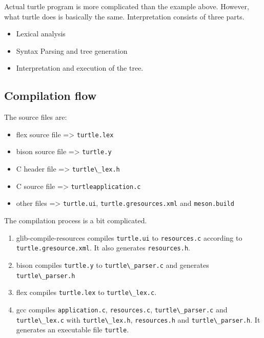 Actual turtle program is more complicated than the example above.
However, what turtle does is basically the same. Interpretation consists
of three parts.

\begin{itemize}
\tightlist
\item
  Lexical analysis
\item
  Syntax Parsing and tree generation
\item
  Interpretation and execution of the tree.
\end{itemize}

\subsection{Compilation flow}\label{compilation-flow}

The source files are:

\begin{itemize}
\tightlist
\item
  flex source file =\textgreater{} \passthrough{\lstinline!turtle.lex!}
\item
  bison source file =\textgreater{} \passthrough{\lstinline!turtle.y!}
\item
  C header file =\textgreater{} \passthrough{\lstinline!turtle\_lex.h!}
\item
  C source file =\textgreater{}
  \passthrough{\lstinline!turtleapplication.c!}
\item
  other files =\textgreater{} \passthrough{\lstinline!turtle.ui!},
  \passthrough{\lstinline!turtle.gresources.xml!} and
  \passthrough{\lstinline!meson.build!}
\end{itemize}

The compilation process is a bit complicated.

\begin{enumerate}
\def\labelenumi{\arabic{enumi}.}
\tightlist
\item
  glib-compile-resources compiles \passthrough{\lstinline!turtle.ui!} to
  \passthrough{\lstinline!resources.c!} according to
  \passthrough{\lstinline!turtle.gresource.xml!}. It also generates
  \passthrough{\lstinline!resources.h!}.
\item
  bison compiles \passthrough{\lstinline!turtle.y!} to
  \passthrough{\lstinline!turtle\_parser.c!} and generates
  \passthrough{\lstinline!turtle\_parser.h!}
\item
  flex compiles \passthrough{\lstinline!turtle.lex!} to
  \passthrough{\lstinline!turtle\_lex.c!}.
\item
  gcc compiles \passthrough{\lstinline!application.c!},
  \passthrough{\lstinline!resources.c!},
  \passthrough{\lstinline!turtle\_parser.c!} and
  \passthrough{\lstinline!turtle\_lex.c!} with
  \passthrough{\lstinline!turtle\_lex.h!},
  \passthrough{\lstinline!resources.h!} and
  \passthrough{\lstinline!turtle\_parser.h!}. It generates an executable
  file \passthrough{\lstinline!turtle!}.
\end{enumerate}

